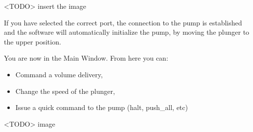 \documentclass[letterpaper,10pt,english]{sphinxmanual}
\begin{document}
\textless{}TODO\textgreater{} insert the image

If you have selected the correct port, the connection to the pump is established and
the software will automatically initialize the pump, by moving the plunger to the upper position.

You are now in the Main Window. From here you can:
\begin{itemize}
\item {} 
Command a volume delivery,

\item {} 
Change the speed of the plunger,

\item {} 
Issue a quick command to the pump (halt, push\_all, etc)

\end{itemize}

\textless{}TODO\textgreater{} image
\end{document}
